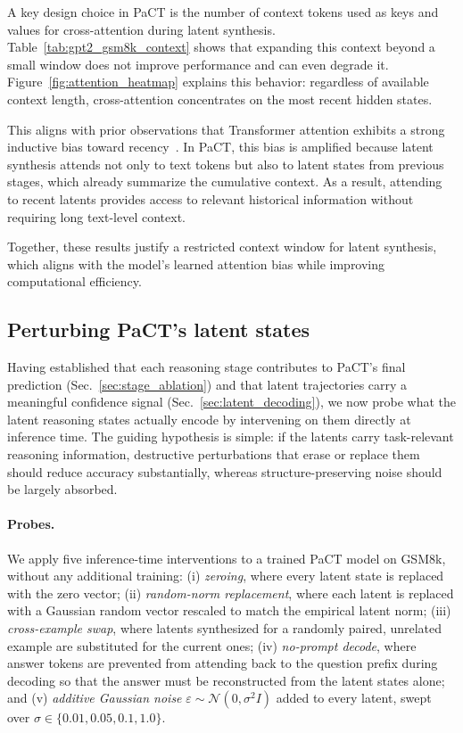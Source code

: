 A key design choice in PaCT is the number of context tokens used as keys and values for cross-attention
during latent synthesis. Table~\ref{tab:gpt2_gsm8k_context} shows that expanding this context beyond a
small window does not improve performance and can even degrade it. Figure~\ref{fig:attention_heatmap}
explains this behavior: regardless of available context length, cross-attention concentrates on the most
recent hidden states.

This aligns with prior observations that Transformer attention exhibits a strong inductive bias toward
recency~\citep{press2021train}. In PaCT, this bias is amplified because latent synthesis attends not only
to text tokens but also to latent states from previous stages, which already summarize the cumulative
context. As a result, attending to recent latents provides access to relevant historical information
without requiring long text-level context.

Together, these results justify a restricted context window for latent synthesis, which aligns with the
model’s learned attention bias while improving computational efficiency.


\subsection{Perturbing PaCT's latent states}
\label{sec:perturbation_analysis}

Having established that each reasoning stage contributes to PaCT's final prediction
(Sec.~\ref{sec:stage_ablation}) and that latent trajectories carry a meaningful confidence signal
(Sec.~\ref{sec:latent_decoding}), we now probe what the latent reasoning states actually encode by
intervening on them directly at inference time. The guiding hypothesis is simple: if the latents
carry task-relevant reasoning information, destructive perturbations that erase or replace them
should reduce accuracy substantially, whereas structure-preserving noise should be largely absorbed.

\paragraph{Probes.}
We apply five inference-time interventions to a trained PaCT model on GSM8k, without any additional
training: (i) \emph{zeroing}, where every latent state is replaced with the zero vector;
(ii) \emph{random-norm replacement}, where each latent is replaced with a Gaussian random vector
rescaled to match the empirical latent norm; (iii) \emph{cross-example swap}, where latents
synthesized for a randomly paired, unrelated example are substituted for the current ones;
(iv) \emph{no-prompt decode}, where answer tokens are prevented from attending back to the question
prefix during decoding so that the answer must be reconstructed from the latent states alone; and
(v) \emph{additive Gaussian noise} $\varepsilon \sim \mathcal{N}(0, \sigma^2 I)$ added to every
latent, swept over $\sigma \in \{0.01, 0.05, 0.1, 1.0\}$.

